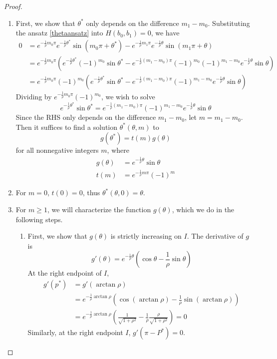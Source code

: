 \documentclass[thesis.tex]{subfiles}
\begin{document}
\begin{lemma}
\begin{proof}
\begin{enumerate}
\item First, we show that $\theta^*$ only depends on the difference $m_1 - m_0$. Substituting the ansatz \cref{thetaansatz} into $H(b_0, b_1) = 0$, we have
\begin{align*}
0 &= e^{-\frac{1}{\rho}m_0 \pi}e^{-\frac{1}{\rho}\theta^*}\sin(m_0 \pi + \theta^*) - e^{-\frac{1}{\rho}m_1 \pi}e^{-\frac{1}{\rho}\theta}\sin(m_1 \pi + \theta) \\
&= e^{-\frac{1}{\rho}m_0 \pi} \left( e^{-\frac{1}{\rho}\theta^*}(-1)^{m_0} \sin \theta^* - e^{-\frac{1}{\rho}(m_1 - m_0) \pi} (-1)^{m_0} (-1)^{m_1 - m_0} e^{-\frac{1}{\rho}\theta}\sin \theta \right) \\
&= e^{-\frac{1}{\rho}m_0 \pi} (-1)^{m_0} \left( e^{-\frac{1}{\rho}\theta^*}\sin \theta^* - e^{-\frac{1}{\rho}(m_1 - m_0) \pi} (-1)^{m_1 - m_0} e^{-\frac{1}{\rho}\theta}\sin \theta \right) 
\end{align*}
Dividing by $e^{-\frac{1}{\rho}m_0 \pi} (-1)^{m_0}$, we wish to solve
\begin{equation}\label{thetaeq1}
e^{-\frac{1}{\rho}\theta^*}\sin \theta^* = e^{-\frac{1}{\rho}(m_1 - m_0) \pi} (-1)^{m_1 - m_0} e^{-\frac{1}{\rho}\theta}\sin \theta 
\end{equation}
Since the RHS only depends on the difference $m_1 - m_0$, let $m = m_1 - m_0$. Then it suffices to find a solution $\theta^*(\theta, m)$ to 
\begin{equation}\label{thetaeq2}
g(\theta^*) = t(m) g(\theta)
\end{equation}
for all nonnegative integers $m$, where
\begin{align*}
g(\theta) &= e^{-\frac{1}{\rho}\theta}\sin \theta  \\
t(m) &= e^{-\frac{1}{\rho}m \pi} (-1)^m
\end{align*}

\item For $m = 0$, $t(0) = 0$, thus $\theta^*(\theta, 0) = \theta$.

\item For $m \geq 1$, we will characterize the function $g(\theta)$, which we do in the following steps.
\begin{enumerate}
	\item First, we show that $g(\theta)$ is strictly increasing on $I$. The derivative of $g$ is 
	\begin{equation}\label{gprime}
	g'(\theta) = e^{ -\frac{1}{\rho} \theta } \left( \cos \theta - \frac{1}{\rho} \sin \theta \right)
	\end{equation}
	At the right endpoint of $I$,
	\begin{align*}
	g'(p^*) &= g'(\arctan \rho) \\
	 &= e^{ -\frac{1}{\rho} \arctan \rho } \left(\cos(\arctan \rho) - \frac{1}{\rho} \sin(\arctan \rho)\right) \\
	&= e^{ -\frac{1}{\rho} \arctan \rho } \left(\frac{1}{\sqrt{1 + \rho^2}} - \frac{1}{\rho} \frac{\rho}{\sqrt{1 + \rho^2}}\right) = 0
	\end{align*}
	Similarly, at the right endpoint $I$, $g'(\pi - P^*) = 0$. 


\end{enumerate}
\end{enumerate}
\end{proof}
\end{lemma}
\end{document}
